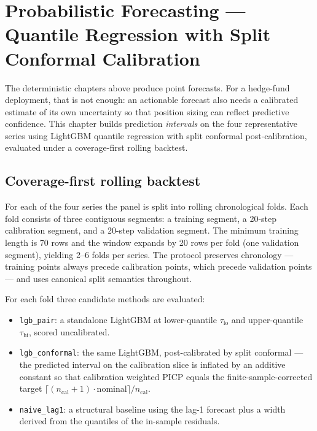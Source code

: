 \section{Probabilistic Forecasting --- Quantile Regression with Split Conformal Calibration}
\label{sec:quantile}

The deterministic chapters above produce point forecasts. For a hedge-fund deployment, that is not enough: an actionable forecast also needs a calibrated estimate of its own uncertainty so that position sizing can reflect predictive confidence. This chapter builds prediction \emph{intervals} on the four representative series using LightGBM quantile regression with split conformal post-calibration, evaluated under a coverage-first rolling backtest.

\subsection{Coverage-first rolling backtest}
\label{sec:quantile:protocol}

For each of the four series the panel is split into rolling chronological folds. Each fold consists of three contiguous segments: a training segment, a 20-step calibration segment, and a 20-step validation segment. The minimum training length is 70 rows and the window expands by 20 rows per fold (one validation segment), yielding 2--6 folds per series. The protocol preserves chronology --- training points always precede calibration points, which precede validation points --- and uses canonical split semantics throughout.

For each fold three candidate methods are evaluated:

\begin{itemize}
  \item \texttt{lgb\_pair}: a standalone LightGBM at lower-quantile $\tau_{\text{lo}}$ and upper-quantile $\tau_{\text{hi}}$, scored uncalibrated.
  \item \texttt{lgb\_conformal}: the same LightGBM, post-calibrated by split conformal --- the predicted interval on the calibration slice is inflated by an additive constant so that calibration weighted PICP equals the finite-sample-corrected target $\lceil(n_{\text{cal}} + 1)\cdot \text{nominal}\rceil / n_{\text{cal}}$.
  \item \texttt{naive\_lag1}: a structural baseline using the lag-1 forecast plus a width derived from the quantiles of the in-sample residuals.
\end{itemize}

